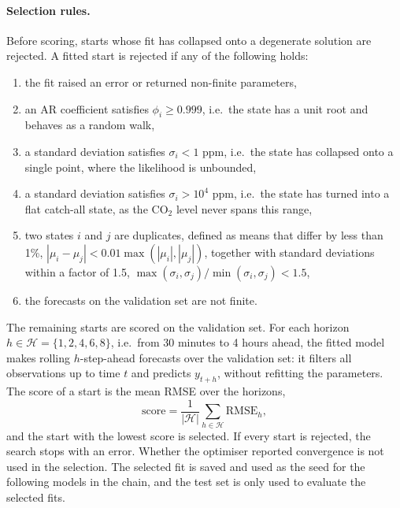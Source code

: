 \paragraph{Selection rules.}
Before scoring, starts whose fit has collapsed onto a degenerate solution are
rejected. A fitted start is rejected if any of the following holds:
\begin{enumerate}
    \item the fit raised an error or returned non-finite parameters,
    \item an AR coefficient satisfies $\phi_i \geq 0.999$, i.e.\ the state has
    a unit root and behaves as a random walk,
    \item a standard deviation satisfies $\sigma_i < 1$ ppm, i.e.\ the state
    has collapsed onto a single point, where the likelihood is unbounded,
    \item a standard deviation satisfies $\sigma_i > 10^4$ ppm, i.e.\ the state
    has turned into a flat catch-all state, as the $\text{CO}_2$ level never
    spans this range,
    \item two states $i$ and $j$ are duplicates, defined as means that differ by
    less than 1\%, $|\mu_i - \mu_j| < 0.01 \max(|\mu_i|, |\mu_j|)$, together
    with standard deviations within a factor of 1.5,
    $\max(\sigma_i, \sigma_j) / \min(\sigma_i, \sigma_j) < 1.5$,
    \item the forecasts on the validation set are not finite.
\end{enumerate}
The remaining starts are scored on the validation set. For each horizon
$h \in \mathcal{H} = \{1, 2, 4, 6, 8\}$, i.e.\ from 30 minutes to 4 hours
ahead, the fitted model makes rolling $h$-step-ahead forecasts over the
validation set: it filters all observations up to time $t$ and predicts
$y_{t+h}$, without refitting the parameters. The score of a start is the mean
RMSE over the horizons,
\begin{equation}
    \text{score} = \frac{1}{|\mathcal{H}|} \sum_{h \in \mathcal{H}} \mathrm{RMSE}_h,
\end{equation}
and the start with the lowest score is selected. If every start is rejected, the
search stops with an error. Whether the optimiser reported convergence is not
used in the selection. The selected fit is saved and used as the seed for the
following models in the chain, and the test set is only used to evaluate the
selected fits.

